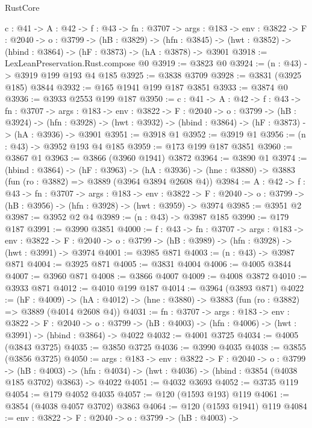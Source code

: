 \begin{lexlean}{RustCore}
\begin{coremodule}
  {c : @41} ->
  {A : @42} ->
  {f : @43} ->
  {fn : @3707} ->
  {args : @183} ->
  {env : @3822} ->
  {F : @2040} ->
  {o : @3799} ->
  (hB : @3829) ->
  (hfn : @3845) -> (hwt : @3852) -> (hbind : @3864) -> (hF : @3873) -> (hA : @3878) -> @3901
@3918 := LexLeanPreservation.Rust.compose @0
@3919 := @3823 @0
@3924 := (n : @43) -> @3919 @199 @193 @4 @185
@3925 := @3838 @3709
@3928 := @3831 (@3925 @185) @3844
@3932 := @165 @1941 @199 @187 @3851
@3933 := @3874 @0
@3936 := @3933 @2553 @199 @187
@3950 := {c : @41} ->
  {A : @42} ->
  {f : @43} ->
  {fn : @3707} ->
  {args : @183} ->
  {env : @3822} ->
  {F : @2040} ->
  {o : @3799} ->
  (hB : @3924) ->
  (hfn : @3928) -> (hwt : @3932) -> (hbind : @3864) -> (hF : @3873) -> (hA : @3936) -> @3901
@3951 := @3918 @1
@3952 := @3919 @1
@3956 := (n : @43) -> @3952 @193 @4 @185
@3959 := @173 @199 @187 @3851
@3960 := @3867 @1
@3963 := @3866 (@3960 @1941) @3872
@3964 := @3890 @1
@3974 := (hbind : @3864) ->
  (hF : @3963) ->
  (hA : @3936) -> (hne : @3880) -> @3883 (fun (ro : @3882) => @3889 (@3964 @3894 @2608 @4))
@3984 := {A : @42} ->
  {f : @43} ->
  {fn : @3707} ->
  {args : @183} ->
  {env : @3822} ->
  {F : @2040} -> {o : @3799} -> (hB : @3956) -> (hfn : @3928) -> (hwt : @3959) -> @3974
@3985 := @3951 @2
@3987 := @3952 @2 @4
@3989 := (n : @43) -> @3987 @185
@3990 := @179 @187
@3991 := @3990 @3851
@4000 := {f : @43} ->
  {fn : @3707} ->
  {args : @183} ->
  {env : @3822} ->
  {F : @2040} -> {o : @3799} -> (hB : @3989) -> (hfn : @3928) -> (hwt : @3991) -> @3974
@4001 := @3985 @871
@4003 := (n : @43) -> @3987 @871
@4004 := @3925 @871
@4005 := @3831 @4004
@4006 := @4005 @3844
@4007 := @3960 @871
@4008 := @3866 @4007
@4009 := @4008 @3872
@4010 := @3933 @871
@4012 := @4010 @199 @187
@4014 := @3964 (@3893 @871)
@4022 := (hF : @4009) ->
  (hA : @4012) -> (hne : @3880) -> @3883 (fun (ro : @3882) => @3889 (@4014 @2608 @4))
@4031 := {fn : @3707} ->
  {args : @183} ->
  {env : @3822} ->
  {F : @2040} ->
  {o : @3799} -> (hB : @4003) -> (hfn : @4006) -> (hwt : @3991) -> (hbind : @3864) -> @4022
@4032 := @4001 @3725
@4034 := @4005 (@3843 @3725)
@4035 := @3850 @3725
@4036 := @3990 @4035
@4038 := @3855 (@3856 @3725)
@4050 := {args : @183} ->
  {env : @3822} ->
  {F : @2040} ->
  {o : @3799} ->
  (hB : @4003) ->
  (hfn : @4034) -> (hwt : @4036) -> (hbind : @3854 (@4038 @185 @3702) @3863) -> @4022
@4051 := @4032 @3693
@4052 := @3735 @119
@4054 := @179 @4052 @4035
@4057 := @120 (@1593 @193) @119
@4061 := @3854 (@4038 @4057 @3702) @3863
@4064 := @120 (@1593 @1941) @119
@4084 := {env : @3822} ->
  {F : @2040} ->
  {o : @3799} ->
  (hB : @4003) ->

\end{coremodule}
\end{lexlean}
